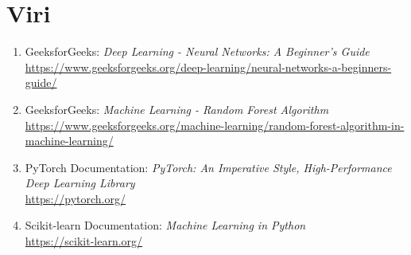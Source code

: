 \documentclass[12pt,a4paper]{article}
\begin{document}
\section*{Viri}

\begin{enumerate}
    \item GeeksforGeeks: \emph{Deep Learning - Neural Networks: A Beginner's Guide}\\
    \url{https://www.geeksforgeeks.org/deep-learning/neural-networks-a-beginners-guide/}
    
    \item GeeksforGeeks: \emph{Machine Learning - Random Forest Algorithm}\\
    \url{https://www.geeksforgeeks.org/machine-learning/random-forest-algorithm-in-machine-learning/}
    
    \item PyTorch Documentation: \emph{PyTorch: An Imperative Style, High-Performance Deep Learning Library}\\
    \url{https://pytorch.org/}
    
    \item Scikit-learn Documentation: \emph{Machine Learning in Python}\\
    \url{https://scikit-learn.org/}
\end{enumerate}
\end{document}
